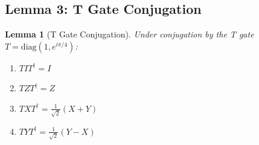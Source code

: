 \documentclass[11pt,a4paper]{article}
\theoremstyle{definition}
\theoremstyle{plain}
\newtheorem{lemma}[theorem]{Lemma}
\begin{document}
\subsection{Lemma 3: T Gate Conjugation}

\begin{lemma}[T Gate Conjugation] \label{lem:tgate}
Under conjugation by the T gate $T = \text{diag}(1, e^{i\pi/4})$:
\begin{enumerate}
\item $T I T^\dagger = I$
\item $T Z T^\dagger = Z$
\item $T X T^\dagger = \frac{1}{\sqrt{2}}(X + Y)$
\item $T Y T^\dagger = \frac{1}{\sqrt{2}}(Y - X)$
\end{enumerate}
\end{lemma}
\end{document}

